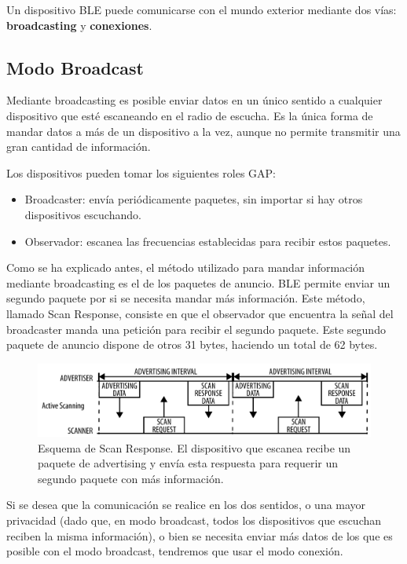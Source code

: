 Un dispositivo BLE puede comunicarse con el mundo exterior mediante dos vías: \textbf{broadcasting} y \textbf{conexiones}.

\subsection{Modo Broadcast}
\label{makereference2.3.1}

Mediante broadcasting es posible enviar datos en un único sentido a cualquier dispositivo que esté escaneando en el radio de escucha. Es la única forma de mandar datos a más de un dispositivo a la vez, aunque no permite transmitir una gran cantidad de información.
 
Los dispositivos pueden tomar los siguientes roles GAP:
\begin{itemize}
	\item Broadcaster: envía periódicamente paquetes, sin importar si hay otros dispositivos escuchando.
	\item Observador: escanea las frecuencias establecidas para recibir estos paquetes. 
\end{itemize}

Como se ha explicado antes, el método utilizado para mandar información mediante broadcasting es el de los paquetes de anuncio. BLE permite enviar un segundo paquete por si se necesita mandar más información. Este método, llamado Scan Response, consiste en que el observador que encuentra la señal del broadcaster manda una petición para recibir el segundo paquete. Este segundo paquete de anuncio dispone de otros 31 bytes, haciendo un total de 62 bytes.

\begin{figure}[h]%
	\centering
    \includegraphics[width=\linewidth]{figures/ble_scan_response.png} %
    \caption[Esquema de Scan Response]{Esquema de Scan Response. El dispositivo que escanea recibe un paquete de advertising y envía esta respuesta para requerir un segundo paquete con más información.}
   	\label{figuraBLEScanResponse}
\end{figure}

Si se desea que la comunicación se realice en los dos sentidos, o una mayor privacidad (dado que, en modo broadcast, todos los dispositivos que escuchan reciben la misma información), o bien se necesita enviar más datos de los que es posible con el modo broadcast, tendremos que usar el modo conexión.

